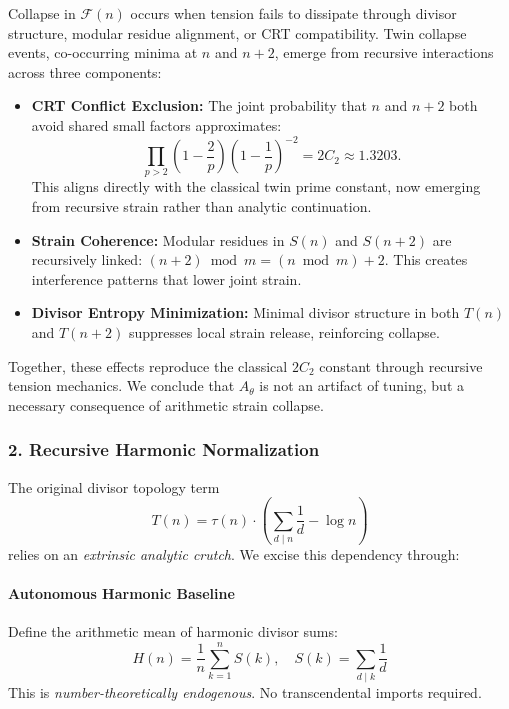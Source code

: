 \documentclass[11pt]{article}
\begin{document}
Collapse in \( \mathcal{F}(n) \) occurs when tension fails to dissipate through divisor structure, modular residue alignment, or CRT compatibility. Twin collapse events, co-occurring minima at \( n \) and \( n+2 \), emerge from recursive interactions across three components:

\begin{itemize}
    \item \textbf{CRT Conflict Exclusion:} The joint probability that \( n \) and \( n+2 \) both avoid shared small factors approximates:
    \[
    \prod_{p > 2} \left(1 - \frac{2}{p} \right) \left(1 - \frac{1}{p} \right)^{-2} = 2C_2 \approx 1.3203.
    \]
    This aligns directly with the classical twin prime constant, now emerging from recursive strain rather than analytic continuation.

    \item \textbf{Strain Coherence:} Modular residues in \( S(n) \) and \( S(n+2) \) are recursively linked: \( (n+2) \bmod m = (n \bmod m) + 2 \). This creates interference patterns that lower joint strain.

    \item \textbf{Divisor Entropy Minimization:} Minimal divisor structure in both \( T(n) \) and \( T(n+2) \) suppresses local strain release, reinforcing collapse.
\end{itemize}

Together, these effects reproduce the classical \( 2C_2 \) constant through recursive tension mechanics. We conclude that \( A_\theta \) is not an artifact of tuning, but a necessary consequence of arithmetic strain collapse.


\subsubsection*{2. Recursive Harmonic Normalization}

The original divisor topology term 
\[
T(n) = \tau(n) \cdot \left( \sum_{d \mid n} \frac{1}{d} - \log n \right)
\]
relies on an \textit{extrinsic analytic crutch}. We excise this dependency through:

\paragraph{Autonomous Harmonic Baseline}
Define the arithmetic mean of harmonic divisor sums:
\[
H(n) = \frac{1}{n} \sum_{k=1}^{n} S(k), \quad S(k) = \sum_{d \mid k} \frac{1}{d}
\]
This is \textit{number-theoretically endogenous}. No transcendental imports required.
\end{document}
